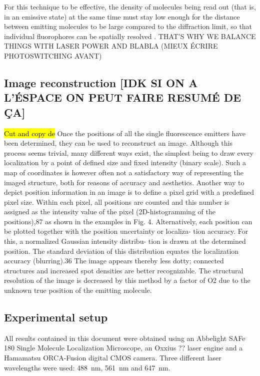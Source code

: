 For this technique to be effective, the density of molecules being read out
(that is, in an emissive state) at the same time must stay low
enough for the distance between emitting molecules to be large
compared to the diﬀraction limit, so that individual fluorophores
can be spatially resolved \cite{furstenberg_single-molecule_2013}.
THAT'S WHY WE BALANCE THINGS WITH LASER POWER AND BLABLA (MIEUX ÉCRIRE PHOTOSWITCHING AVANT)

\subsection{Image reconstruction [IDK SI ON A L'ÉSPACE ON PEUT FAIRE RESUMÉ DE ÇA]}
\hl{Cut and copy de }\cite{furstenberg_single-molecule_2013}
Once the positions of all the single fluorescence emitters have
been determined, they can be used to reconstruct an image.
Although this process seems trivial, many diﬀerent ways exist,
the simplest being to draw every localization by a point of defined
size and fixed intensity (binary scale). Such a map of coordinates
is however often not a satisfactory way of representing the imaged
structure, both for reasons of accuracy and aesthetics.
Another way to depict position information in an image is to
define a pixel grid with a predefined pixel size. Within each pixel,
all positions are counted and this number is assigned as the
intensity value of the pixel (2D-histogramming of the positions),87
as shown in the examples in Fig. 4. Alternatively, each position
can be plotted together with the position uncertainty or localiza-
tion accuracy. For this, a normalized Gaussian intensity distribu-
tion is drawn at the determined position. The standard deviation
of this distribution equates the localization accuracy (blurring).36
The image appears thereby less dotty; connected structures and
increased spot densities are better recognizable. The structural
resolution of the image is decreased by this method by a factor of
O2 due to the unknown true position of the emitting molecule.

\subsection{Experimental setup}
All results contained in this document were obtained using an Abbelight SAFe 180 Single Molecule Localization Microscope, an Oxxius ?? laser engine and a Hamamatsu ORCA-Fusion digital CMOS camera.
Three different laser wavelengths were used: \mbox{488 nm}, \mbox{561 nm} and \mbox{647 nm}.

